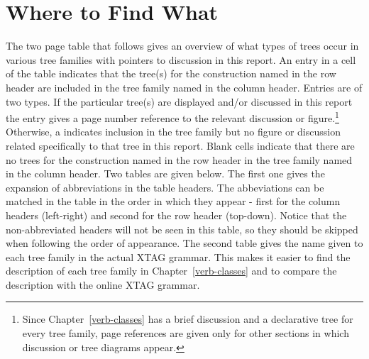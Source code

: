 \chapter{Where to Find What}
\label{table-intro}

The two page table that follows gives an overview of what types of trees
occur in various tree families with pointers to discussion in this report.
An entry in a cell of the table indicates that the tree(s) for the
construction named in the row header are included in the tree family named
in the column header. Entries are of two types.  If the particular tree(s)
are displayed and/or discussed in this report the entry gives a page number
reference to the relevant discussion or figure.\footnote{Since
Chapter~\ref{verb-classes} has a brief discussion and a declarative tree
for every tree family, page references are given only for other sections in
which discussion or tree diagrams appear.}  Otherwise, a \xtagcheck \space
indicates inclusion in the tree family but no figure or discussion related
specifically to that tree in this report.  Blank cells indicate that there
are no trees for the construction named in the row header in the tree
family named in the column header.  Two tables are given below.  The first
one gives the expansion of abbreviations in the table headers. The
abbeviations can be matched in the table in the order in which they appear
- first for the column headers (left-right) and second for the row header
(top-down). Notice that the non-abbreviated headers will not be seen in
this table, so they should be skipped when following the order of
appearance. The second table gives the name given to each tree family in
the actual XTAG grammar. This makes it easier to find the description of
each tree family in Chapter~\ref{verb-classes} and to compare the
description with the online XTAG grammar.

\vspace{0.3in}

